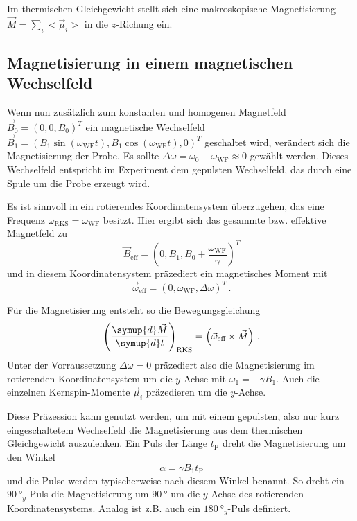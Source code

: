 Im thermischen Gleichgewicht stellt sich eine makroskopische Magnetisierung $\vec{M} = \sum_i <\vec{\mu}_i>$ in die $z$-Richung ein.

\subsection{Magnetisierung in einem magnetischen Wechselfeld}
\label{ssec:Magnetisierung_wechsel}

Wenn nun zusätzlich zum konstanten und homogenen Magnetfeld $\vec{B}_0 = (0,0,B_0)^T$ ein magnetische Wechselfeld
$\vec{B}_1 = (B_1 \sin(\omega_\text{WF} t),B_1 \cos(\omega_\text{WF} t),0)^T$ geschaltet wird, verändert sich die Magnetisierung der Probe.
Es sollte $\Delta \omega = \omega_0 - \omega_\text{WF} \approx 0$ gewählt werden.
Dieses Wechselfeld entspricht im Experiment dem gepulsten Wechselfeld, das durch eine Spule um die Probe erzeugt wird.

Es ist sinnvoll in ein rotierendes Koordinatensystem überzugehen, das eine Frequenz $\omega_\text{RKS} = \omega_\text{WF}$ besitzt.
Hier ergibt sich das gesammte bzw. effektive Magnetfeld zu
\begin{equation}
    \vec{B}_\text{eff} = (0, B_1, B_0 + \frac{\omega_\text{WF}}{\gamma})^T
\end{equation}
und in diesem Koordinatensystem präzediert ein magnetisches Moment mit 
\begin{equation}
    \vec{\omega}_\text{eff} = (0, \omega_\text{WF}, \Delta \omega)^T \, .
\end{equation}

Für die Magnetisierung entsteht so die Bewegungsgleichung 
\begin{equation}
    \left( \frac{\symup{d} \vec{M}}{\symup{d} t} \right)_\text{RKS} = \left( \vec{\omega}_\text{eff} \times \vec{M} \right) \, .
    \label{eq:M_beweg}
\end{equation}
Unter der Vorraussetzung $\Delta \omega = 0$ präzediert also die Magnetisierung im rotierenden Koordinatensystem um die $y$-Achse mit $\omega_1 = - \gamma B_1$.
Auch die einzelnen Kernspin-Momente $\vec{\mu}_i$ präzedieren um die $y$-Achse.

Diese Präzession kann genutzt werden, um mit einem gepulsten, also nur kurz eingeschaltetem Wechselfeld die Magnetisierung aus dem thermischen Gleichgewicht auszulenken.
Ein Puls der Länge $t_\text{P}$ dreht die Magnetisierung um den Winkel
\begin{equation}
    \alpha = \gamma B_1 t_\text{P}
\end{equation}
und die Pulse werden typischerweise nach diesem Winkel benannt.
So dreht ein $\SI{90}{\degree}_y$-Puls die Magnetisierung um $\SI{90}{\degree}$ um die $y$-Achse des rotierenden Koordinatensystems. 
Analog ist z.B. auch ein $\SI{180}{\degree}_y$-Puls definiert.

